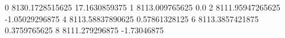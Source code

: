 0 8130.1728515625 17.1630859375
1 8113.009765625 0.0
2 8111.95947265625 -1.05029296875
4 8113.58837890625 0.57861328125
6 8113.3857421875 0.3759765625
8 8111.279296875 -1.73046875
